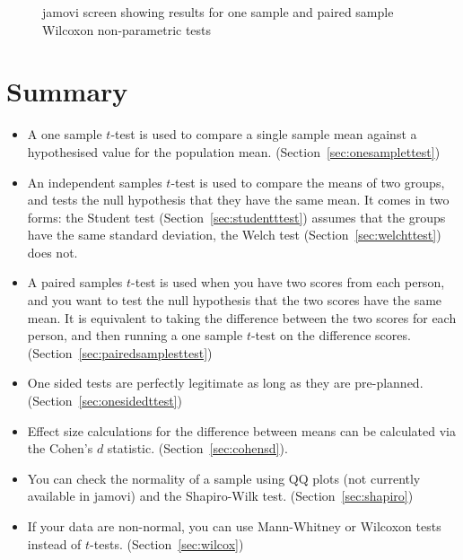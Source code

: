 \vspace{0.5cm}
\begin{figure}[ht]
\begin{center}
\caption{jamovi screen showing results for one sample and paired sample Wilcoxon non-parametric tests}
\HR
\label{fig:ttest_nonparametric}
\end{center}
\end{figure}


\section{Summary}

\begin{itemize} \itemsep -2pt
\item A one sample $t$-test is used to compare a single sample mean against a hypothesised value for the population mean. (Section~\ref{sec:onesamplettest})
\item An independent samples $t$-test is used to compare the means of two groups, and tests the null hypothesis that they have the same mean. It comes in two forms: the Student test (Section~\ref{sec:studentttest}) assumes that the groups have the same standard deviation, the Welch test (Section~\ref{sec:welchttest}) does not.
\item A paired samples $t$-test is used when you have two scores from each person, and you want to test the null hypothesis that the two scores have the same mean. It is equivalent to taking the difference between the two scores for each person, and then running a one sample $t$-test on the difference scores. (Section~\ref{sec:pairedsamplesttest})
\item One sided tests are perfectly legitimate as long as they are pre-planned. (Section~\ref{sec:onesidedttest})
\item Effect size calculations for the difference between means can be calculated via the Cohen's $d$ statistic. (Section~\ref{sec:cohensd}).
\item You can check the normality of a sample using QQ plots (not currently available in jamovi) and the Shapiro-Wilk test. (Section~\ref{sec:shapiro})
\item If your data are non-normal, you can use Mann-Whitney or Wilcoxon tests instead of $t$-tests. (Section~\ref{sec:wilcox})
\end{itemize}








